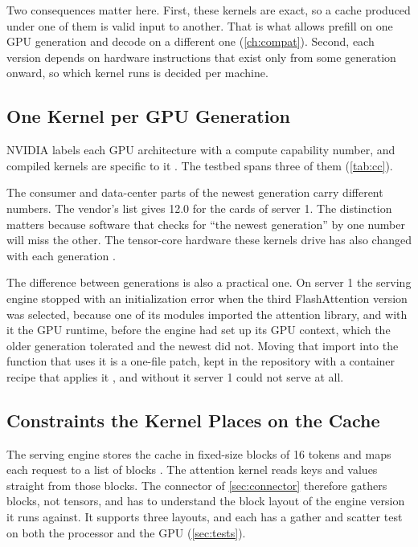 Two consequences matter here. First, these kernels are exact, so a cache
produced under one of them is valid input to another. That is what allows
prefill on one GPU generation and decode on a different one
(\cref{ch:compat}). Second, each version depends on hardware instructions
that exist only from some generation onward, so which kernel runs is decided
per machine.

\subsection{One Kernel per GPU Generation}

NVIDIA labels each GPU architecture with a compute capability number, and
compiled kernels are specific to it \citep{cuda_gpus}. The testbed spans
three of them (\cref{tab:cc}).

The consumer and data-center parts of the newest generation carry different
numbers. The vendor's list gives 12.0 for the cards of server 1. The distinction matters because software that
checks for ``the newest generation'' by one number will miss the other. The
tensor-core hardware these kernels drive has also changed with each
generation \citep{patel2025tensorcore}.

The difference between generations is also a practical one. On server 1 the
serving engine stopped with an initialization error when the third
FlashAttention version was selected, because one of its modules imported the
attention library, and with it the GPU runtime, before the engine had set up
its GPU context, which the older generation tolerated and the newest did not.
Moving that import into the function that uses it is a one-file patch, kept
in the repository with a container recipe that applies it
\citep{scuffedrdma}, and without it server 1 could not serve at all.

\subsection{Constraints the Kernel Places on the Cache}

The serving engine stores the cache in fixed-size blocks of 16 tokens and
maps each request to a list of blocks \citep{kwon2023vllm}. The attention
kernel reads keys and values straight from those blocks. The connector of \cref{sec:connector} therefore gathers blocks, not tensors, and has to understand
the block layout of the engine version it runs against. It supports three
layouts, and each has a gather and scatter test on both the processor and the
GPU (\cref{sec:tests}).

